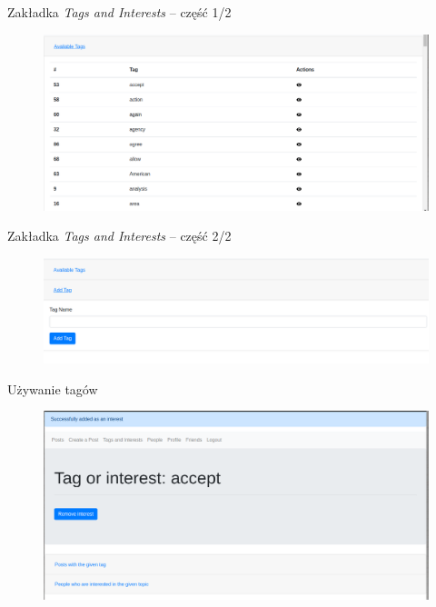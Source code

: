 \documentclass[handout]{beamer}
\begin{document}
        \begin{frame}{Zakładka \textit{Tags and Interests} -- część 1/2}
            \begin{figure}
                \centering
                \includegraphics[width=\linewidth]{available_tags.png}
            \end{figure}
        \end{frame}
        
        \begin{frame}{Zakładka \textit{Tags and Interests} -- część 2/2}
            \begin{figure}
                \centering
                \includegraphics[width=\linewidth]{tag_creation.png}
            \end{figure}
        \end{frame}
        
        \begin{frame}{Używanie tagów}
            \begin{figure}
                \centering
                \includegraphics[width=\linewidth]{interests.png}
            \end{figure}
        \end{frame}
\end{document}

